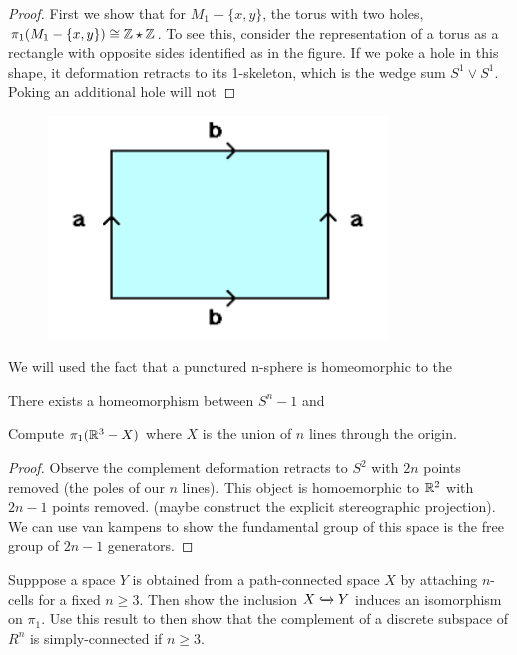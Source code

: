 \documentclass[10pt]{article}
\begin{document}
\begin{proof}
	First we show that for $M_1 - \{x, y\}$, the torus with two holes, $\pi_1(M_1
	- \{x, y\}) \cong \mathbb{Z} \star \mathbb{Z}$. To see this, consider the representation of a
	torus as a rectangle with opposite sides identified as in the figure. If we
	poke a hole in this shape, it deformation retracts to its 1-skeleton, which
	is the wedge sum $S^1 \vee S^1$. Poking an additional hole will not 
\end{proof}


\begin{figure}[ht!]
\centering
\includegraphics[width=90mm]{./torus.png}
\caption{}
\end{figure}



We will used the fact that a punctured n-sphere is homeomorphic to the 

\begin{proposition}
There exists a homeomorphism between $S^n-1$ and
\end{proposition}

\begin{exercise}[1.2.4]
	Compute $\pi_1(\mathbb{R}^3 - X)$ where $X$ is the union of $n$ lines through the origin.
\end{exercise}

\begin{proof}
	Observe the complement deformation retracts to $S^2$ with $2n$ points removed (the poles of our $n$ lines). This object is homoemorphic to $\mathbb{R}^2$ with $2n-1$ points removed. (maybe construct the explicit stereographic projection). We can use van kampens to show the fundamental group of this space is the free group of $2n-1$ generators.
\end{proof}

\begin{exercise}[1.2.6]
	Supppose a space $Y$ is obtained from a path-connected space $X$ by attaching
	$n$-cells for a fixed $n \geq 3$. Then show the inclusion $X
	\xhookrightarrow{} Y$ induces an isomorphism on $\pi_1$. Use this result to
	then show	that the complement of a discrete subspace of $R^n$ is simply-connected if $n
	\geq 3$.
\end{exercise}
\end{document}
